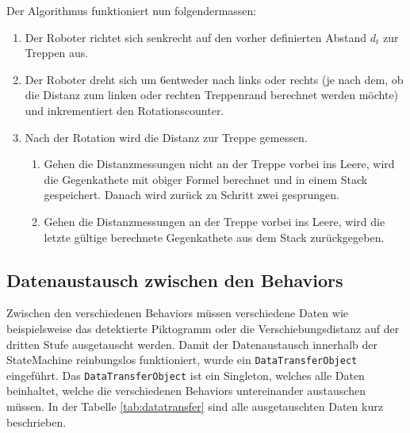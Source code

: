 Der Algorithmus funktioniert nun folgendermassen:
\begin{enumerate}
    \item Der Roboter richtet sich senkrecht auf den vorher definierten Abstand $d_t$ zur Treppen aus.
    \item Der Roboter dreht sich um 6\textdegree entweder nach links oder rechts (je nach dem, ob die Distanz zum linken oder rechten Treppenrand berechnet werden möchte) und inkrementiert den Rotationscounter.
    \item Nach der Rotation wird die Distanz zur Treppe gemessen.
    \begin{enumerate}
        \item Gehen die Distanzmessungen nicht an der Treppe vorbei ins Leere, wird die Gegenkathete mit obiger Formel berechnet und in einem Stack gespeichert. Danach wird zurück zu Schritt zwei gesprungen.
        \item Gehen die Distanzmessungen an der Treppe vorbei ins Leere, wird die letzte gültige berechnete Gegenkathete aus dem Stack zurückgegeben.
    \end{enumerate}
\end{enumerate}

\newpage

\subsection{Datenaustausch zwischen den Behaviors}
Zwischen den verschiedenen Behaviors müssen verschiedene Daten wie beispielsweise das detektierte Piktogramm oder die Verschiebungsdistanz auf der dritten Stufe ausgetauscht werden. Damit der Datenaustausch innerhalb der StateMachine reinbungslos funktioniert, wurde ein \texttt{DataTransferObject} eingeführt. Das \texttt{DataTransferObject} ist ein Singleton, welches alle Daten beinhaltet, welche die verschiedenen Behaviors untereinander austauschen müssen. In der Tabelle \ref{tab:datatransfer} sind alle ausgetauschten Daten kurz beschrieben.

